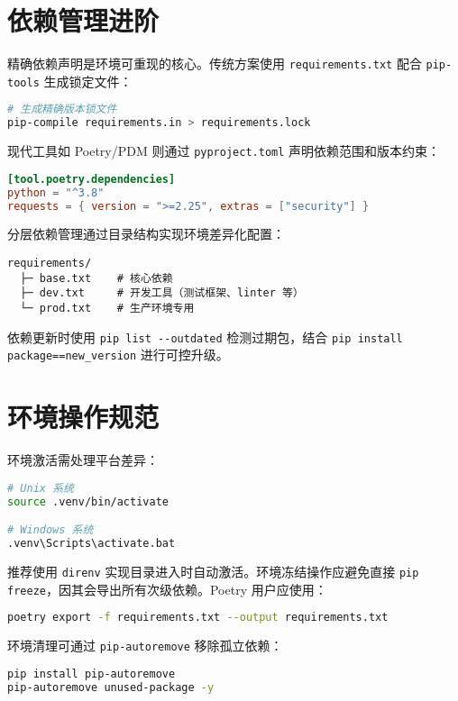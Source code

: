 \section{依赖管理进阶}
精确依赖声明是环境可重现的核心。传统方案使用 \verb!requirements.txt! 配合 \verb!pip-tools! 生成锁定文件：\par
\begin{lstlisting}[language=bash]
# 生成精确版本锁文件
pip-compile requirements.in > requirements.lock
\end{lstlisting}
现代工具如 Poetry/PDM 则通过 \verb!pyproject.toml! 声明依赖范围和版本约束：\par
\begin{lstlisting}[language=toml]
[tool.poetry.dependencies]
python = "^3.8"
requests = { version = ">=2.25", extras = ["security"] }
\end{lstlisting}
分层依赖管理通过目录结构实现环境差异化配置：\par
\begin{lstlisting}
requirements/
  ├─ base.txt    # 核心依赖
  ├─ dev.txt     # 开发工具（测试框架、linter 等）
  └─ prod.txt    # 生产环境专用
\end{lstlisting}
依赖更新时使用 \verb!pip list --outdated! 检测过期包，结合 \verb!pip install package==new_version! 进行可控升级。\par
\section{环境操作规范}
环境激活需处理平台差异：\par
\begin{lstlisting}[language=bash]
# Unix 系统
source .venv/bin/activate  

# Windows 系统
.venv\Scripts\activate.bat
\end{lstlisting}
推荐使用 \verb!direnv! 实现目录进入时自动激活。环境冻结操作应避免直接 \verb!pip freeze!，因其会导出所有次级依赖。Poetry 用户应使用：\par
\begin{lstlisting}[language=bash]
poetry export -f requirements.txt --output requirements.txt
\end{lstlisting}
环境清理可通过 \verb!pip-autoremove! 移除孤立依赖：\par
\begin{lstlisting}[language=bash]
pip install pip-autoremove
pip-autoremove unused-package -y
\end{lstlisting}
